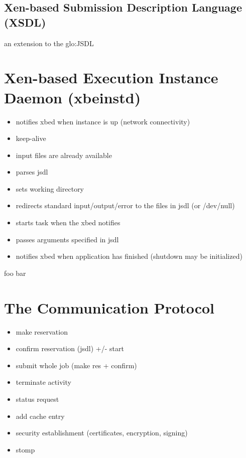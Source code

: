 \subsection[Xen-based Submission Description Language]{Xen-based Submission Description Language (XSDL)}
\label{sec:xen-based-submission}

an extension to the \gls{glo:JSDL}


\section[Xen-based Execution Instance Daemon]{Xen-based Execution Instance Daemon (xbeinstd)}
\label{sec:xbeinstd}

\begin{itemize}
\item notifies xbed when instance is up (\ie network connectivity)
\item keep-alive
\item input files are already available
\item parses jsdl
\item sets working directory
\item redirects standard input/output/error to the files in jsdl (or /dev/null)
\item starts task when the xbed notifies
\item passes arguments specified in jsdl
\item notifies xbed when application has finished (shutdown may be initialized)
\end{itemize}
foo bar

\section{The Communication Protocol}
\label{sec:communication-protocol}

\begin{itemize}
\item make reservation
\item confirm reservation (jsdl) +/- start
\item submit whole job (make res + confirm)
\item terminate activity
\item status request
\item add cache entry
\item security establishment (certificates, encryption, signing)
\item stomp
\end{itemize}

